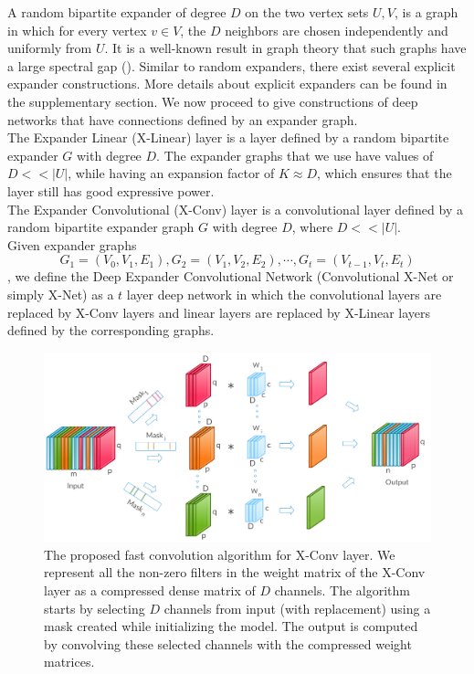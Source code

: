  A random bipartite expander of degree $D$ on the two vertex sets $U, V$, is a graph in which for every vertex $v \in V$, the $D$ neighbors are chosen independently and uniformly from $U$. It is a well-known result in graph theory that such graphs have a large spectral gap (\cite{salil2012pseudo}). Similar to random expanders, there exist several explicit expander constructions. More details about explicit expanders can be found in the supplementary section.
We now proceed to give constructions of deep networks that have connections defined by an expander graph.\\

 The Expander Linear (X-Linear) layer is a layer defined by a random bipartite expander $G$ with degree $D$. The expander graphs that we use have values of $D << |U|$, while having an expansion factor of $K \approx D$, which ensures that the layer still has good expressive power.\\

 The Expander Convolutional (X-Conv) layer is a convolutional layer defined by a random bipartite expander graph $G$ with degree $D$, where $D << |U|$.\\ 

 Given expander graphs 
$$G_1 = (V_0,V_1,E_1), G_2 = (V_1,V_2,E_2), \cdots, G_t = (V_{t-1},V_t,E_t)$$, we define the Deep Expander Convolutional Network (Convolutional X-Net or simply X-Net) as a $t$ layer deep network in which the convolutional layers are replaced by X-Conv layers and linear layers are replaced by X-Linear layers defined by the corresponding graphs.

\begin{figure}[t]
\centering
\includegraphics[width=1.0\textwidth]{figures/Expander.png}

\caption{The proposed fast convolution algorithm for X-Conv layer. We represent all the non-zero filters in the weight matrix of the X-Conv layer as a compressed dense matrix of $D$ channels. The algorithm starts by selecting $D$ channels from input (with replacement) using a mask created while initializing the model. The output is computed by convolving these selected channels with the compressed weight matrices.}
\label{fig:efficientmatrix}

\end{figure}

